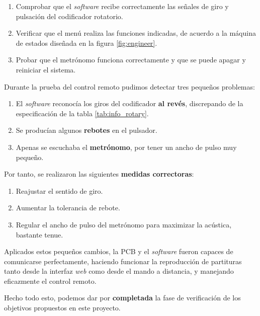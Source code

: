 \begin{enumerate}
	\item Comprobar que el \textit{software} recibe correctamente las señales de giro y pulsación del codificador rotatorio.
	
	\item Verificar que el menú realiza las funciones indicadas, de acuerdo a la máquina de estados diseñada en la figura \ref{fig:engineer}.
	
	\item Probar que el metrónomo funciona correctamente y que se puede apagar y reiniciar el sistema.
\end{enumerate}

Durante la prueba del control remoto pudimos detectar tres pequeños problemas:

\begin{enumerate}
	\item El \textit{software} reconocía los giros del codificador \textbf{al revés}, discrepando de la especificación de la tabla \ref{tab:info_rotary}.
	\item Se producían algunos \textbf{rebotes} en el pulsador.
	\item Apenas se escuchaba el \textbf{metrónomo}, por tener un ancho de pulso muy pequeño.
\end{enumerate}

Por tanto, se realizaron las siguientes \textbf{medidas correctoras}:

\begin{enumerate}
	\item Reajustar el sentido de giro.
	\item Aumentar la tolerancia de rebote.
	\item Regular el ancho de pulso del metrónomo para maximizar la acústica, bastante tenue.
\end{enumerate}

Aplicados estos pequeños cambios, la \acrshort{PCB} y el \textit{software} fueron capaces de comunicarse perfectamente, haciendo funcionar la reproducción de partituras tanto desde la interfaz \textit{web} como desde el mando a distancia, y manejando eficazmente el control remoto. 

Hecho todo esto, podemos dar por \textbf{completada} la fase de verificación de los objetivos propuestos en este proyecto.

\newpage
\clearpage{\pagestyle{empty}\cleardoublepage}